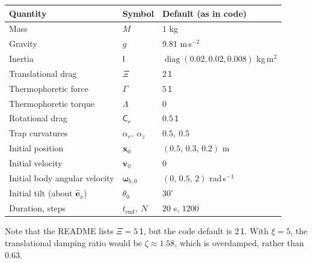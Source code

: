 \documentclass[11pt]{article}
\newcommand{\vect}[1]{\bm{#1}}
\newcommand{\tens}[1]{\mathsf{#1}}
\theoremstyle{remark}
\begin{document}
\begin{center}
\begin{tabular}{@{}lll@{}}
\toprule
Quantity & Symbol & Default (as in code) \\
\midrule
Mass & $M$ & $1$ kg \\
Gravity & $g$ & $9.81$ m\,s$^{-2}$ \\
Inertia & $\tens{I}$ & $\operatorname{diag}(0.02,0.02,0.008)$ kg\,m$^2$ \\
Translational drag & $\tens{\Xi}$ & $2\,\tens{1}$ \\
Thermophoretic force & $\tens{\Gamma}$ & $5\,\tens{1}$ \\
Thermophoretic torque & $\tens{\Lambda}$ & $0$ \\
Rotational drag & $\tens{C}_r$ & $0.5\,\tens{1}$ \\
Trap curvatures & $\alpha_r,\ \alpha_z$ & $0.5,\ 0.5$ \\
Initial position & $\vect{x}_0$ & $(0.5,\,0.3,\,0.2)$ m \\
Initial velocity & $\vect{v}_0$ & $0$ \\
Initial body angular velocity & $\vect{\omega}_{b,0}$ & $(0,\,0.5,\,2)$ rad\,s$^{-1}$ \\
Initial tilt (about $\hat{\vect{e}}_x$) & $\theta_0$ & $30^\circ$ \\
Duration, steps & $t_{\text{end}},\ N$ & $20$ s, $1200$ \\
\bottomrule
\end{tabular}
\end{center}

Note that the README lists $\tens{\Xi}=5\,\tens{1}$, but the code default
is $2\,\tens{1}$. With $\xi=5$, the translational damping ratio would be
$\zeta\approx1.58$, which is overdamped, rather than $0.63$.
\end{document}
